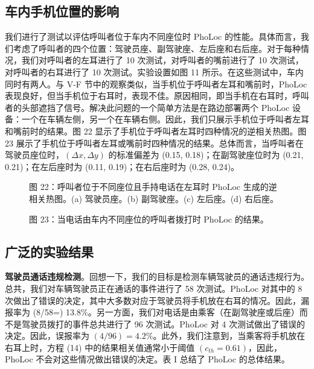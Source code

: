 \documentclass[journal, onecolumn]{IEEEtran}
\begin{document}
\subsection{车内手机位置的影响}
我们进行了测试以评估呼叫者位于车内不同座位时 PhoLoc 的性能。具体而言，我们考虑了呼叫者的四个位置：驾驶员座、副驾驶座、左后座和右后座。对于每种情况，我们对呼叫者的左耳进行了 10 次测试，对呼叫者的嘴前进行了 10 次测试，对呼叫者的右耳进行了 10 次测试。实验设置如图 11 所示。在这些测试中，车内同时有两人。与 V-F 节中的观察类似，当手机位于呼叫者左耳和嘴前时，PhoLoc 表现良好，但当手机位于右耳时，表现不佳。原因相同，即当手机在右耳时，呼叫者的头部遮挡了信号。解决此问题的一个简单方法是在路边部署两个 PhoLoc 设备：一个在车辆左侧，另一个在车辆右侧。因此，我们只展示手机位于呼叫者左耳和嘴前时的结果。图 22 显示了手机位于呼叫者左耳时四种情况的逆相关热图。图 23 展示了手机位于呼叫者左耳或嘴前时四种情况的结果。总体而言，当呼叫者在驾驶员座位时，$(\Delta x,\Delta y)$ 的标准偏差为 (0.15, 0.18)；在副驾驶座位时为 (0.21, 0.21)；在左后座时为 (0.11, 0.19)；在右后座时为 (0.28, 0.24)。

\begin{figure}[htbp]
\centering
\caption{图 22：呼叫者位于不同座位且手持电话在左耳时 PhoLoc 生成的逆相关热图。(a) 驾驶员座。(b) 副驾驶座。(c) 左后座。(d) 右后座。}
\label{fig:22}
\end{figure}

\begin{figure}[htbp]
\centering
\caption{图 23：当电话由车内不同座位的呼叫者拨打时 PhoLoc 的结果。}
\label{fig:23}
\end{figure}

\subsection{广泛的实验结果}
\textbf{驾驶员通话违规检测}。回想一下，我们的目标是检测车辆驾驶员的通话违规行为。总共，我们对车辆驾驶员正在通话的事件进行了 58 次测试。PhoLoc 对其中的 8 次做出了错误的决定，其中大多数对应于驾驶员将手机放在右耳的情况。因此，漏报率为 (8/58=) 13.8\%。另一方面，我们对电话是由乘客（在副驾驶座或后座）而不是驾驶员拨打的事件总共进行了 96 次测试。PhoLoc 对 4 次测试做出了错误的决定。因此，误报率为 $(4/96)=4.2\%$。此外，我们注意到，当乘客将手机放在右耳上时，方程 (14) 中的结果相关值通常小于阈值 $(c_{th}=0.61)$，因此，PhoLoc 不会对这些情况做出错误的决定。表 I 总结了 PhoLoc 的总体结果。
\end{document}
